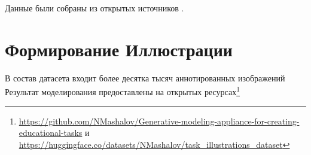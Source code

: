 Данные были собраны из открытых источников \cite{libmipt}\cite{mathedu}. 

\section{Формирование Иллюстрации}




В состав датасета входит более десятка тысяч аннотированных изображений  
Результат моделирования предоставлены 
на открытых ресурсах\footnote{
\url{https://github.com/NMashalov/Generative-modeling-appliance-for-creating-educational-tasks}
и \url{https://huggingface.co/datasets/NMashalov/task_illustrations_dataset}
}